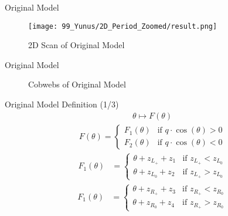 \begin{frame}{Original Model}
	\begin{figure}
		\centering
		\texttt{[image: 99\_Yunus/2D\_Period\_Zoomed/result.png]}
		\caption{2D Scan of Original Model}
	\end{figure}
\end{frame}

\begin{frame}{Original Model}
	\begin{figure}
		\centering
		\caption{Cobwebs of Original Model}
	\end{figure}
\end{frame}

\begin{frame}{Original Model Definition (1/3)}
	\begin{align}
		\theta \mapsto F(\theta)
	\end{align}
	\begin{align}
		F(\theta) = \begin{cases}
			            F_1(\theta) & \text{if } q \cdot \cos(\theta) > 0 \\
			            F_2(\theta) & \text{if } q \cdot \cos(\theta) < 0
		            \end{cases}
	\end{align}
	\begin{align}
		F_1(\theta) & = \begin{cases}
			                \theta + z_{L_+} + z_1 & \text{if } z_{L_+} < z_{L_0} \\
			                \theta + z_{L_0} + z_2 & \text{if } z_{L_+} > z_{L_0}
		                \end{cases}
	\end{align}
	\begin{align}
		F_1(\theta) & = \begin{cases}
			                \theta + z_{R_+} + z_3 & \text{if } z_{R_+} < z_{R_0} \\
			                \theta + z_{R_0} + z_4 & \text{if } z_{R_+} > z_{R_0}
		                \end{cases}
	\end{align}
\end{frame}

